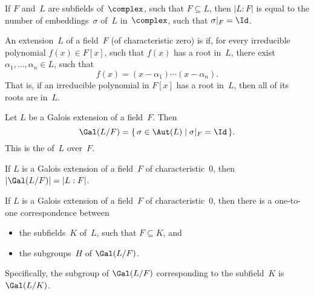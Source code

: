 \begin{prop}
  If $F$ and~$L$ are subfields of~$\complex$, such that $F
\subseteq L$, then $|L:F|$ is equal to the number of
embeddings~$\sigma$ of~$L$ in~$\complex$, such that
$\sigma|_F = \Id$.
 \end{prop}

\begin{defn}
 An extension~$L$ of a field~$F$ (of characteristic zero) is  if, for every irreducible polynomial $f(x)
\in F[x]$, such that $f(x)$ has a root in~$L$, there exist
$\alpha_1,\ldots,\alpha_n \in L$, such that 
 $$ f(x) = (x - \alpha_1) \cdots (x - \alpha_n) .$$
 That is, if an irreducible polynomial in $F[x]$ has a root
in~$L$, then all of its roots are in~$L$.
 \end{defn}

\begin{defn}
 Let $L$ be a Galois extension of a field~$F$. Then
 $$ \Gal(L/F) = \{\, \sigma \in \Aut(L) \mid \sigma|_F = \Id
\,\} .$$
 This is the  of~$L$ over~$F$.
 \end{defn}

\begin{prop}
  If $L$ is a Galois extension of a field~$F$ of
characteristic~$0$, then $|{\Gal(L/F)}| = |L:F|$.
 \end{prop}

\begin{cor}
 If $L$ is a Galois extension of a field~$F$ of
characteristic\/~$0$, then there is a one-to-one correspondence
between
 \begin{itemize}
 \item the subfields~$K$ of~$L$, such that $F \subseteq K$, and
 \item the subgroups~$H$ of\/ $\Gal(L/F)$.
 \end{itemize}
 Specifically, the subgroup of\/ $\Gal(L/F)$ corresponding to the subfield~$K$ is\/ $\Gal(L/K)$.
 \end{cor}


